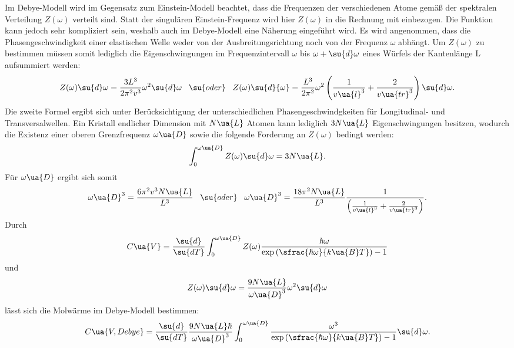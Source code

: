 Im Debye-Modell wird im Gegensatz zum Einstein-Modell beachtet, dass die Frequenzen der
verschiedenen Atome gemäß der spektralen Verteilung $Z(\omega)$ verteilt sind.
Statt der singulären Einstein-Frequenz wird hier $Z(\omega)$
in die Rechnung mit einbezogen. Die Funktion kann jedoch sehr kompliziert sein,
weshalb auch im Debye-Modell eine Näherung eingeführt wird. Es wird angenommen,
dass die Phasengeschwindigkeit einer elastischen Welle weder von der Ausbreitungsrichtung
noch von der Frequenz $\omega$ abhängt. Um $Z(\omega)$ zu bestimmen müssen somit
lediglich die Eigenschwingungen im Frequenzintervall $\omega$ bis $\omega + \su{d}\omega$
eines Würfels der Kantenlänge L aufsummiert werden:
\begin{equation}
  \label{eqn:Z}
  Z(\omega)\su{d}\omega = \frac{3L^3}{2\pi^2v^3}\omega^2\su{d}\omega \,\,\,\,\, \su{oder} \,\,\,\,\,
  Z(\omega)\su{d}{\omega} = \frac{L^3}{2\pi^2}\omega^2\left( \frac{1}{v\ua{l}^3} + \frac{2}{v\ua{tr}^3}\right)\su{d}\omega.
\end{equation}
Die zweite Formel ergibt sich unter Berücksichtigung der unterschiedlichen Phasengeschwindgkeiten
für Longitudinal- und Transversalwellen.
Ein Kristall endlicher Dimension mit $N\ua{L}$ Atomen kann lediglich $3N\ua{L}$
Eigenschwingungen besitzen, wodurch die Existenz einer oberen Grenzfrequenz $\omega\ua{D}$
sowie die folgende Forderung an $Z(\omega)$ bedingt werden:
\begin{equation}
  \int_0^{\omega\ua{D}}Z(\omega)\su{d}\omega = 3N\ua{L}.
\end{equation}
Für $\omega\ua{D}$ ergibt sich somit
\begin{equation}
  \label{eqn:omega_D}
  \omega\ua{D}^3 = \frac{6\pi^2v^3N\ua{L}}{L^3} \,\,\,\,\, \su{oder} \,\,\,\,\,
  \omega\ua{D}^3 = \frac{18\pi^2N\ua{L}}{L^3} \frac{1}{\left(\frac{1}{v\ua{l}^3}+\frac{2}{v\ua{tr}^3}\right)}.
\end{equation}
Durch
\begin{equation}
  C\ua{V} = \frac{\su{d}}{\su{dT}} \int_0^{\omega\ua{D}} Z(\omega) \frac{\hbar\omega}{\exp{(\sfrac{\hbar\omega}{k\ua{B}T})}-1}
\end{equation}
und
\begin{equation}
  Z(\omega)\su{d}\omega = \frac{9N\ua{L}}{\omega\ua{D}^3}\omega^2 \su{d}\omega
\end{equation}
lässt sich die Molwärme im Debye-Modell bestimmen:
\begin{equation}
  C\ua{V, Debye} = \frac{\su{d}}{\su{dT}} \frac{9N\ua{L}\hbar}{\omega\ua{D}^3}\int_0^{\omega\ua{D}} \frac{\omega^3}{\exp{(\sfrac{\hbar\omega}{k\ua{B}T})}-1} \su{d}\omega.
\end{equation}
